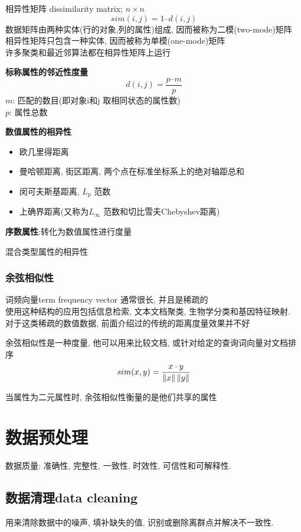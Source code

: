 \documentclass{article}
\begin{document}
相异性矩阵 dissimilarity matrix; $n \times n$
$$
sim(i,j) = 1 – d(i,j)
$$
数据矩阵由两种实体(行的对象,列的属性)组成, 因而被称为二模(two-mode)矩阵\\
相异性矩阵只包含一种实体, 因而被称为单模(one-mode)矩阵\\

许多聚类和最近邻算法都在相异性矩阵上运行

\textbf{标称属性的邻近性度量}
$$
d(i,j) = \frac{p – m}{p}
$$
$m$: 匹配的数目(即对象i和j 取相同状态的属性数)\\
$p$: 属性总数

\textbf{数值属性的相异性}\par
\begin{itemize}
\item 欧几里得距离
\item 曼哈顿距离, 街区距离, 两个点在标准坐标系上的绝对轴距总和
\item 闵可夫斯基距离, $L_p$ 范数
\item 上确界距离(又称为$L_{\infty}$ 范数和切比雪夫Chebyshev距离)
\end{itemize}

\textbf{序数属性}:转化为数值属性进行度量

混合类型属性的相异性

\subsubsection{余弦相似性}
词频向量term frequency vector 通常很长, 并且是稀疏的\\
使用这种结构的应用包括信息检索, 文本文档聚类, 生物学分类和基因特征映射.\\
对于这类稀疏的数值数据, 前面介绍过的传统的距离度量效果并不好

余弦相似性是一种度量, 他可以用来比较文档, 或针对给定的查询词向量对文档排序
$$sim(x,y) = \dfrac{x \cdot y}{\left\Vert x\right\Vert \left\Vert y\right\Vert}$$

当属性为二元属性时, 余弦相似性衡量的是他们共享的属性

\section{数据预处理}
数据质量: 准确性, 完整性, 一致性, 时效性, 可信性和可解释性.

\subsection{数据清理data cleaning}
用来清除数据中的噪声, 填补缺失的值, 识别或删除离群点并解决不一致性.
\end{document}
